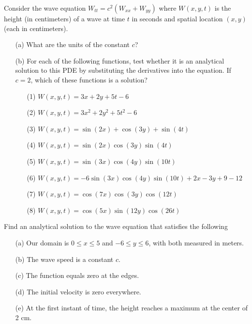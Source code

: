 \begin{problem}
    Consider the wave equation $W_{tt} = c^2 ( W_{xx} + W_{yy})$ where $W(x,y,t)$ is the
    height (in centimeters) of a wave at time $t$ in seconds and spatial location $(x,y)$
    (each in centimeters).
    \begin{enumerate}
        \item[(a)] What are the units of the constant $c$?
        \item[(b)] For each of the following functions, test whether it is an analytical
            solution to this PDE by substituting the derivatives into the equation.  If $c
            = 2$, which of these functions is a solution?

            \begin{enumerate}
                \item[(1)] $W(x,y,t) = 3x + 2y + 5 t - 6$
                \item[(2)] $W(x,y,t) = 3x^2 + 2y^2 + 5 t^2 - 6$
                \item[(3)] $W(x,y,t) = \sin( 2 x) + \cos(3 y) + \sin(4t)$
                \item[(4)] $W(x,y,t) = \sin( 2 x) \cos(3 y) \sin(4t)$
                \item[(5)] $W(x,y,t) = \sin(3 x) \cos(4 y) \sin(10t)$
                \item[(6)] $W(x,y,t) = -6\sin( 3 x) \cos(4 y) \sin(10t)+2x -3y+9-12$
                \item[(7)] $W(x,y,t) = \cos(7 x) \cos(3 y) \cos(12t)$
                \item[(8)] $W(x,y,t) = \cos(5 x) \sin(12 y) \cos(26t)$
            \end{enumerate}
    \end{enumerate}
\end{problem}


\begin{problem}
    Find an analytical solution to the wave equation that satisfies the following
    \begin{itemize}
        \item[(a)] Our domain is $0 \leq x \leq 5$ and $-6 \leq y \leq 6$, with both measured
            in meters.
        \item[(b)] The wave speed is a constant $c$.
        \item[(c)] The function equals zero at the edges.
        \item[(d)] The initial velocity is zero everywhere.
        \item[(e)] At the first instant of time, the height reaches a maximum at the center of
            2 cm.
    \end{itemize}
\end{problem}


